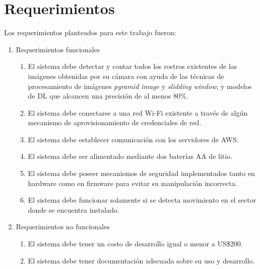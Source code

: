 \section{Requerimientos}
Los requerimientos planteados para este trabajo fueron:
\begin{enumerate}
	\item Requerimientos funcionales
  \begin{enumerate}
     	\item El sistema debe detectar y contar todos los rostros existentes de las imágenes obtenidas por su cámara con ayuda de las técnicas de procesamiento de imágenes \textit{pyramid image} y \textit{slidding window}, y modelos de DL que alcancen una precisión de al menos 80\%.
		\item El sistema debe conectarse a una red Wi-Fi existente a través de algún mecanismo de aprovisionamiento de credenciales de red.
		\item El sistema debe establecer comunicación con los servidores de AWS.
		\item El sistema debe ser alimentado mediante dos baterías AA de litio.
		\item El sistema debe poseer mecanismos de seguridad implementados tanto en hardware como en firmware para evitar su manipulación incorrecta.
		\item El sistema debe funcionar solamente si se detecta movimiento en el sector donde se encuentra instalado.
	\end{enumerate}
	\item Requerimientos no funcionales
	\begin{enumerate}
		\item El sistema debe tener un costo de desarrollo igual o menor a US\$200.
		\item El sistema debe tener documentación adecuada sobre su uso y desarrollo.
	\end{enumerate}
\end{enumerate}







